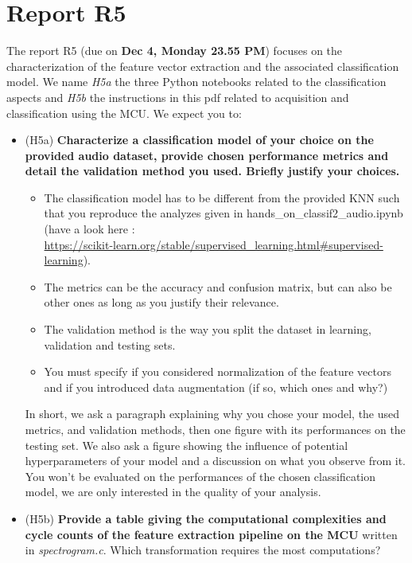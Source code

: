 \section{Report R5}
%
The report R5 (due on \textbf{Dec 4, Monday 23.55 PM}) focuses on the characterization of the feature vector extraction and the associated classification model. We name \emph{H5a} the three Python notebooks related to the classification aspects and \emph{H5b} the instructions in this pdf related to acquisition and classification using the MCU. We expect you to:
%
\begin{itemize}
    \item (H5a) \textbf{Characterize a classification model of your choice on the provided audio dataset, provide chosen performance metrics and detail the validation method you used. Briefly justify your choices.}
    \begin{itemize}
        \item The classification model has to be different from the provided KNN such that you reproduce the analyzes given in hands\_on\_classif2\_audio.ipynb (have a look here :\\ \url{https://scikit-learn.org/stable/supervised\_learning.html#supervised-learning}).
        \item The metrics can be the accuracy and confusion matrix, but can also be other ones as long as you justify their relevance.
        \item The validation method is the way you split the dataset in learning, validation and testing sets.
        \item You must specify if you considered normalization of the feature vectors and if you introduced data augmentation (if so, which ones and why?)
    \end{itemize}
    In short, we ask a paragraph explaining why you chose your model, the used metrics, and validation methods, then one figure with its performances on the testing set. We also ask a figure showing the influence of potential hyperparameters of your model and a discussion on what you observe from it. You won't be evaluated on the performances of the chosen classification model, we are only interested in the quality of your analysis.
    \item (H5b) \textbf{Provide a table giving the computational complexities and cycle counts of the feature extraction pipeline on the MCU} written in \emph{spectrogram.c}. Which transformation requires the most computations? \\

\end{itemize}
